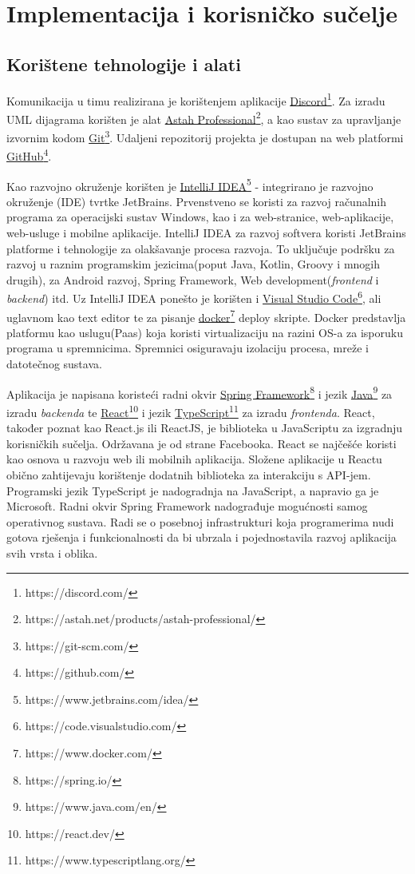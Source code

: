 \chapter{Implementacija i korisničko sučelje}
		
		
		\section{Korištene tehnologije i alati}
			 
			 Komunikacija u timu realizirana je korištenjem aplikacije \underline{Discord}\footnote{https://discord.com/}. Za izradu UML dijagrama korišten je alat \underline{Astah Professional}\footnote{https://astah.net/products/astah-professional/}, a kao sustav za upravljanje izvornim kodom \underline{Git}\footnote{https://git-scm.com/}. Udaljeni repozitorij projekta je dostupan na web platformi \underline{GitHub}\footnote{https://github.com/}.
			 
			 Kao razvojno okruženje korišten je \underline{IntelliJ IDEA}\footnote{https://www.jetbrains.com/idea/} - integrirano je razvojno \newline okruženje (IDE) tvrtke JetBrains. Prvenstveno se koristi za razvoj računalnih programa za operacijski sustav Windows, kao i za web-stranice, web-aplikacije, web-usluge i mobilne aplikacije. IntelliJ IDEA za razvoj softvera koristi JetBrains platforme i tehnologije za olakšavanje procesa razvoja. To uključuje podršku za razvoj u raznim programskim jezicima(poput Java, Kotlin, Groovy i mnogih drugih), za Android razvoj, Spring Framework, Web development(\textit{frontend} i \textit{backend}) itd. Uz IntelliJ IDEA ponešto je korišten i \underline{Visual Studio Code}\footnote{https://code.visualstudio.com/}, ali uglavnom kao text editor te za pisanje \underline{docker}\footnote{https://www.docker.com/} deploy skripte. Docker predstavlja platformu kao uslugu(Paas) koja koristi virtualizaciju na razini OS-a za isporuku programa u spremnicima. Spremnici osiguravaju izolaciju procesa, mreže i datotečnog sustava.
			 
			 Aplikacija je napisana koristeći radni okvir \underline{Spring Framework}\footnote{https://spring.io/} i jezik \underline{Java}\footnote{https://www.java.com/en/} za izradu \textit{backenda} te \underline{React}\footnote{https://react.dev/} i jezik \underline{TypeScript}\footnote{https://www.typescriptlang.org/} za izradu \textit{frontenda}. React, također poznat kao React.js ili ReactJS, je biblioteka u JavaScriptu za izgradnju korisničkih sučelja. Održavana je od strane Facebooka. React se najčešće koristi kao osnova u razvoju web ili mobilnih aplikacija. Složene aplikacije u Reactu obično zahtijevaju korištenje dodatnih biblioteka za interakciju s API-jem. Programski jezik TypeScript je nadogradnja na JavaScript, a napravio ga je Microsoft. Radni okvir Spring Framework nadograđuje mogućnosti samog operativnog sustava. Radi se o posebnoj infrastrukturi koja programerima nudi gotova rješenja i funkcionalnosti da bi ubrzala i pojednostavila razvoj aplikacija svih vrsta i oblika.
			 
